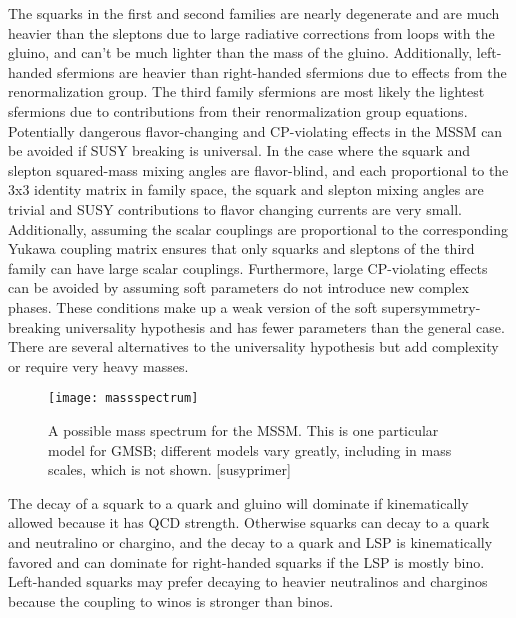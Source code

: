 
The squarks in the first and second families are nearly degenerate and are much heavier than the sleptons due to large radiative corrections from loops with the gluino, and can't be much lighter than the mass of the gluino.  Additionally, left-handed sfermions are heavier than right-handed sfermions due to effects from the renormalization group.  The third family sfermions are most likely the lightest sfermions due to contributions from their renormalization group equations. \\

Potentially dangerous flavor-changing and CP-violating effects in the MSSM can be avoided if SUSY breaking is universal.  In the case where the squark and slepton squared-mass mixing angles are flavor-blind, and each proportional to the 3x3 identity matrix in family space, the squark and slepton mixing angles are trivial and SUSY contributions to flavor changing currents are very small.  Additionally, assuming the scalar couplings are proportional to the corresponding Yukawa coupling matrix ensures that only squarks and sleptons of the third family can have large scalar couplings.  Furthermore, large CP-violating effects can be avoided by assuming soft parameters do not introduce new complex phases.  These conditions make up a weak version of the soft supersymmetry-breaking universality hypothesis and has fewer parameters than the general case.  There are several alternatives to the universality hypothesis but add complexity or require very heavy masses. \\

\begin{figure}[tbh]
	\centering
	\texttt{[image: massspectrum]}
	\caption{A possible mass spectrum for the MSSM.  This is one particular model for GMSB; different models vary greatly, including in mass scales, which is not shown.  [susyprimer] \color{red}{Replace with higher resolution image.  Add other possible spectra?} }
	\label{fig:massspect}
\end{figure}

The decay of a squark to a quark and gluino will dominate if kinematically allowed because it has QCD strength.  Otherwise squarks can decay to a quark and neutralino or chargino, and the decay to a quark and LSP is kinematically favored and can dominate for right-handed squarks if the LSP is mostly bino.  Left-handed squarks may prefer decaying to heavier neutralinos and charginos because the coupling to winos is stronger than binos.  \\

